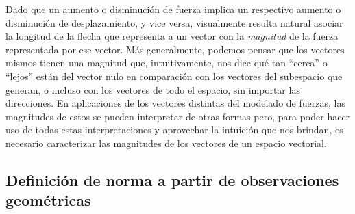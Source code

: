 \documentclass[12pt,dvipsnames]{article}
\numberwithin{equation}{section}
\begin{document}
Dado que un aumento o disminución de fuerza implica un respectivo aumento o disminución de desplazamiento, y vice versa, visualmente resulta natural asociar la longitud de la flecha que representa a un vector con la \emph{magnitud} de la fuerza representada por ese vector. Más generalmente, podemos pensar que los vectores mismos tienen una magnitud que, intuitivamente, nos dice qué tan ``cerca'' o ``lejos'' están del vector nulo en comparación con los vectores del subespacio que generan, o incluso con los vectores de todo el espacio, sin importar las direcciones. En aplicaciones de los vectores distintas del modelado de fuerzas, las magnitudes de estos se pueden interpretar de otras formas pero, para poder hacer uso de todas estas interpretaciones y aprovechar la intuición que nos brindan, es necesario caracterizar las magnitudes de los vectores de un espacio vectorial.

\subsection{Definición de norma a partir de observaciones geométricas}

\end{document}
